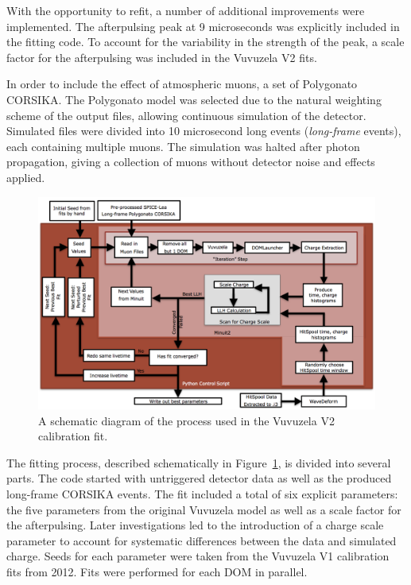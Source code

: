 With the opportunity to refit, a number of additional improvements were implemented.
The afterpulsing peak at 9 microseconds was explicitly included in the fitting code.
To account for the variability in the strength of the peak, a scale factor for the afterpulsing was included in the Vuvuzela V2 fits.

In order to include the effect of atmospheric muons, a set of Polygonato CORSIKA.
The Polygonato model was selected due to the natural weighting scheme of the output files, allowing continuous simulation of the detector.
Simulated files were divided into 10 microsecond long events (\emph{long-frame} events), each containing multiple muons.
The simulation was halted after photon propagation, giving a collection of muons without detector noise and effects applied.

\begin{landscape}
\centering
\begin{figure}
\includegraphics[height=0.8\textwidth]{fit_flowchart.png} 
\caption[Schematic diagram of Vuvuzela V2 calibration fit]{A schematic diagram of the process used in the Vuvuzela V2 calibration fit.}
\label{fig:fit_flowchart}
\end{figure}
\end{landscape}

The fitting process, described schematically in Figure~\ref{fig:fit_flowchart}, is divided into several parts. 
The code started with untriggered detector data as well as the produced long-frame CORSIKA events. 
The fit included a total of six explicit parameters: the five parameters from the original Vuvuzela model as well as a scale factor for the afterpulsing.
Later investigations led to the introduction of a charge scale parameter to account for systematic differences between the data and simulated charge.
Seeds for each parameter were taken from the Vuvuzela V1 calibration fits from 2012.
Fits were performed for each DOM in parallel.

